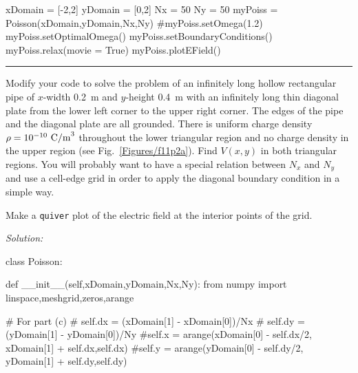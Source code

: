 \begin{enumerate}
\begin{codeexample}
\begin{VerbatimOut}{\listingFile}
xDomain = [-2,2]
yDomain = [0,2]
Nx = 50
Ny = 50
myPoiss = Poisson(xDomain,yDomain,Nx,Ny)
#myPoiss.setOmega(1.2)
myPoiss.setOptimalOmega()
myPoiss.setBoundaryConditions()
myPoiss.relax(movie = True)
myPoiss.plotEField()

\end{VerbatimOut}
\end{codeexample}
\else
\noindent\rule{5 in}{0.01 in}
\fi


\probtwo \label{P:20.2}
\begin{enumerate}

\subprob \label{P:20.2a}
Modify your code to solve the problem of an infinitely long
hollow rectangular pipe of $x$-width 0.2~m and $y$-height
0.4~m with an infinitely long thin diagonal plate from the
lower left corner to the upper right corner. The edges of the
pipe and the diagonal plate are all grounded. There is
uniform charge density $\rho = 10^{-10}~{\rm C/m}^3$
throughout the lower triangular region and no charge density
in the upper region (see Fig.~\ref{Figures/f11p2a}). Find
$V(x,y)$ in both triangular regions. You will probably want
to have a special relation between $N_x$ and $N_y$ and use a
cell-edge grid in order to apply the diagonal boundary
condition in a simple way.


\subprob \label{P:20.2b} Make a {\tt quiver} plot of the
    electric field at the interior points of the grid.  


\end{enumerate}
\ifsolutions
\textit{Solution:}\\
\begin{codeexample}
\begin{VerbatimOut}{\listingFile}

class Poisson:

    def __init__(self,xDomain,yDomain,Nx,Ny):
        from numpy import linspace,meshgrid,zeros,arange

        # For part (c)
        #        self.dx = (xDomain[1] - xDomain[0])/Nx
        # self.dy = (yDomain[1] - yDomain[0])/Ny
        #self.x = arange(xDomain[0] - self.dx/2, xDomain[1] + self.dx,self.dx)
        #self.y = arange(yDomain[0] - self.dy/2, yDomain[1] + self.dy,self.dy)


\end{VerbatimOut}
\end{codeexample}
\end{enumerate}
